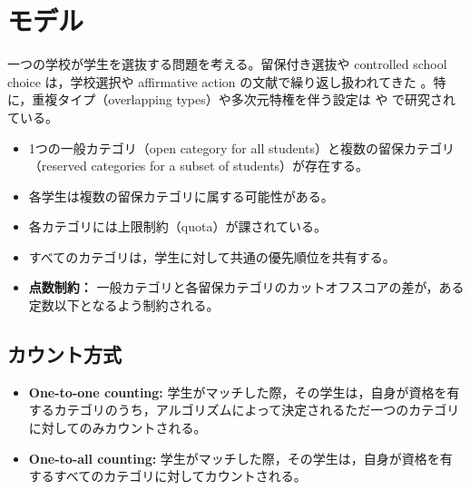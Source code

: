 \documentclass[
  12pt,
  a4paper,
  oneside,
  onecolumn,
  titlepage,
  final
]{jsarticle}
\newcommand{\1}{\mathbf{1}}
\begin{document}
\title{}


\rhead{} %




\section{モデル}

一つの学校が学生を選抜する問題を考える。留保付き選抜や controlled school choice は，学校選択や affirmative action の文献で繰り返し扱われてきた \citep{Abdu05a,EHYY14a,AyTu20a,AyTu23a}。特に，重複タイプ（overlapping types）や多次元特権を伴う設定は \citet{KHIY17a} や \citet{AyBo21a} で研究されている。

\begin{itemize}
    \item 1つの一般カテゴリ（open category for all students）と複数の留保カテゴリ（reserved categories for a subset of students）が存在する。
    
    \item 各学生は複数の留保カテゴリに属する可能性がある。
    
    \item 各カテゴリには上限制約（quota）が課されている。
    
    \item すべてのカテゴリは，学生に対して共通の優先順位を共有する。
    
    \item \textbf{点数制約：} 一般カテゴリと各留保カテゴリのカットオフスコアの差が，ある定数以下となるよう制約される。
\end{itemize}


\subsection{カウント方式}

\begin{itemize}
    \item \textbf{One-to-one counting:} 学生がマッチした際，その学生は，自身が資格を有するカテゴリのうち，アルゴリズムによって決定されるただ一つのカテゴリに対してのみカウントされる。
    \item \textbf{One-to-all counting:} 学生がマッチした際，その学生は，自身が資格を有するすべてのカテゴリに対してカウントされる。
\end{itemize}
\end{document}
